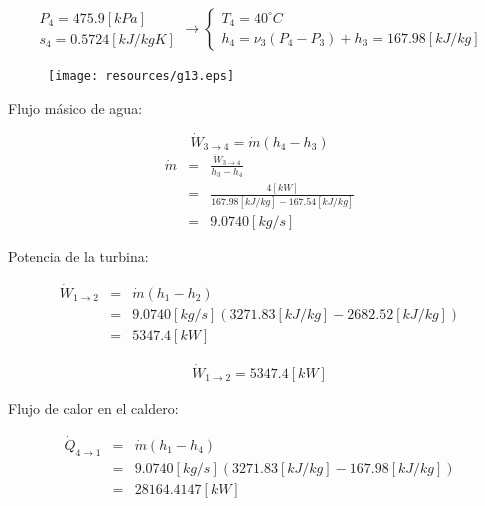 \documentclass[letter,10pt]{article}
\begin{document}
\begin{enumerate}
\begin{eqnarray*}
    \begin{array}{c}
        P_4 = 475.9[kPa] \\
        s_4 = 0.5724[kJ/kg K]
    \end{array}
    \rightarrow
    \begin{cases}
        T_4 = 40^\circ C \\
        h_4 = \nu_3 (P_4-P_3) + h_3 = 167.98[kJ/kg]
    \end{cases}
\end{eqnarray*}

\begin{figure}[H]
\centering
\texttt{[image: resources/g13.eps]}
\end{figure}

Flujo másico de agua:

\begin{equation*}
    \dot{W}_{3\rightarrow4} = \dot{m} (h_4 - h_3)
\end{equation*}
\begin{eqnarray*}
    \dot{m} &=& \frac{\dot{W}_{3\rightarrow4}}{h_3 - h_4} \\
            &=& \frac{4[kW]}{167.98[kJ/kg]-167.54[kJ/kg]} \\
            &=& 9.0740[kg/s]
\end{eqnarray*}

Potencia de la turbina:

\begin{eqnarray*}
    \dot{W}_{1\rightarrow2} &=& \dot{m}(h_1 - h_2) \\
                            &=& 9.0740[kg/s](3271.83[kJ/kg]-2682.52[kJ/kg]) \\
                            &=& 5347.4[kW]
\end{eqnarray*}

\begin{equation*}
\boxed{
    \begin{array}{l}
        \dot{W}_{1\rightarrow2} = 5347.4[kW]
    \end{array}
}
\end{equation*}

Flujo de calor en el caldero:

\begin{eqnarray*}
    \dot{Q}_{4\rightarrow1} &=& \dot{m}(h_1 - h_4) \\
                            &=& 9.0740[kg/s](3271.83[kJ/kg]-167.98[kJ/kg]) \\
                            &=& 28164.4147[kW]
\end{eqnarray*}


\end{enumerate}
\end{document}
